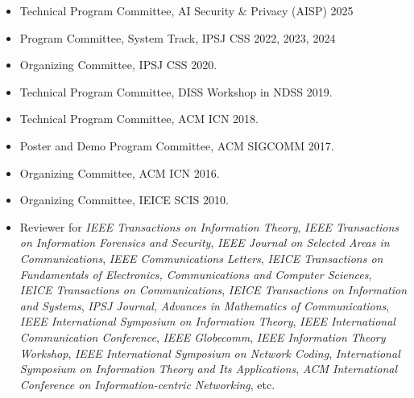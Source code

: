 \begin{itemize}
 \item Technical Program Committee, AI Security \& Privacy (AISP) 2025
 \item Program Committee, System Track, IPSJ CSS 2022, 2023, 2024
 \item Organizing Committee, IPSJ CSS 2020.
 \item Technical Program Committee, DISS Workshop in NDSS 2019.
 \item Technical Program Committee, ACM ICN 2018.
 \item Poster and Demo Program Committee, ACM SIGCOMM 2017.
 \item Organizing Committee, ACM ICN 2016.
 \item Organizing Committee, IEICE SCIS 2010.
 \item Reviewer for
\textit{IEEE Transactions on Information Theory},
\textit{IEEE Transactions on Information Forensics and Security},
\textit{IEEE Journal on Selected Areas in Communications},
\textit{IEEE Communications Letters},
\textit{IEICE Transactions on Fundamentals of Electronics, Communications and Computer Sciences},
\textit{IEICE Transactions on Communications},
\textit{IEICE Transactions on Information and Systems},
\textit{IPSJ Journal},
\textit{Advances in Mathematics of Communications},
\textit{IEEE International Symposium on Information Theory},
\textit{IEEE International Communication Conference},
\textit{IEEE Globecomm},
\textit{IEEE Information Theory Workshop},
\textit{IEEE International Symposium on Network Coding},
\textit{International Symposium on Information Theory and Its Applications},
\textit{ACM International Conference on Information-centric Networking},
%
etc.
\end{itemize}
